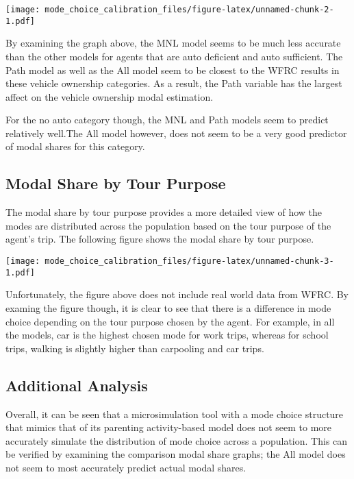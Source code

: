 \documentclass[3p, authoryear]{elsarticle} %
\begin{document}
\texttt{[image: mode\_choice\_calibration\_files/figure-latex/unnamed-chunk-2-1.pdf]}

By examining the graph above, the MNL model seems to be much less accurate than the other models for agents that are auto deficient and auto sufficient. The Path model as well as the All model seem to be closest to the WFRC results in these vehicle ownership categories. As a result, the Path variable has the largest affect on the vehicle ownership modal estimation.

For the no auto category though, the MNL and Path models seem to predict relatively well.The All model however, does not seem to be a very good predictor of modal shares for this category.

\hypertarget{modal-share-by-tour-purpose}{%
\subsection{Modal Share by Tour Purpose}\label{modal-share-by-tour-purpose}}

The modal share by tour purpose provides a more detailed view of how the modes are distributed across the population based on the tour purpose of the agent's trip. The following figure shows the modal share by tour purpose.

\texttt{[image: mode\_choice\_calibration\_files/figure-latex/unnamed-chunk-3-1.pdf]}

Unfortunately, the figure above does not include real world data from WFRC. By examing the figure though, it is clear to see that there is a difference in mode choice depending on the tour purpose chosen by the agent. For example, in all the models, car is the highest chosen mode for work trips, whereas for school trips, walking is slightly higher than carpooling and car trips.

\hypertarget{additional-analysis}{%
\subsection{Additional Analysis}\label{additional-analysis}}

Overall, it can be seen that a microsimulation tool with a mode choice structure that mimics that of its parenting activity-based model does not seem to more accurately simulate the distribution of mode choice across a population. This can be verified by examining the comparison modal share graphs; the All model does not seem to most accurately predict actual modal shares.
\end{document}
